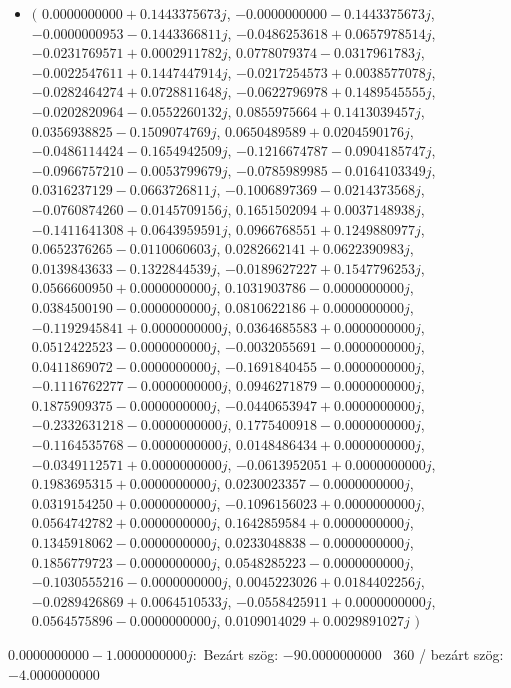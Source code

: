 \documentclass[14pt,a4paper]{article}
\begin{document}
\begin{itemize}
\item
$\big($
$0.0000000000+0.1443375673j$, $-0.0000000000-0.1443375673j$, $-0.0000000953-0.1443366811j$, $-0.0486253618+0.0657978514j$, $-0.0231769571+0.0002911782j$, $0.0778079374-0.0317961783j$, $-0.0022547611+0.1447447914j$, $-0.0217254573+0.0038577078j$, $-0.0282464274+0.0728811648j$, $-0.0622796978+0.1489545555j$, $-0.0202820964-0.0552260132j$, $0.0855975664+0.1413039457j$, $0.0356938825-0.1509074769j$, $0.0650489589+0.0204590176j$, $-0.0486114424-0.1654942509j$, $-0.1216674787-0.0904185747j$, $-0.0966757210-0.0053799679j$, $-0.0785989985-0.0164103349j$, $0.0316237129-0.0663726811j$, $-0.1006897369-0.0214373568j$, $-0.0760874260-0.0145709156j$, $0.1651502094+0.0037148938j$, $-0.1411641308+0.0643959591j$, $0.0966768551+0.1249880977j$, $0.0652376265-0.0110060603j$, $0.0282662141+0.0622390983j$, $0.0139843633-0.1322844539j$, $-0.0189627227+0.1547796253j$, $0.0566600950+0.0000000000j$, $0.1031903786-0.0000000000j$, $0.0384500190-0.0000000000j$, $0.0810622186+0.0000000000j$, $-0.1192945841+0.0000000000j$, $0.0364685583+0.0000000000j$, $0.0512422523-0.0000000000j$, $-0.0032055691-0.0000000000j$, $0.0411869072-0.0000000000j$, $-0.1691840455-0.0000000000j$, $-0.1116762277-0.0000000000j$, $0.0946271879-0.0000000000j$, $0.1875909375-0.0000000000j$, $-0.0440653947+0.0000000000j$, $-0.2332631218-0.0000000000j$, $0.1775400918-0.0000000000j$, $-0.1164535768-0.0000000000j$, $0.0148486434+0.0000000000j$, $-0.0349112571+0.0000000000j$, $-0.0613952051+0.0000000000j$, $0.1983695315+0.0000000000j$, $0.0230023357-0.0000000000j$, $0.0319154250+0.0000000000j$, $-0.1096156023+0.0000000000j$, $0.0564742782+0.0000000000j$, $0.1642859584+0.0000000000j$, $0.1345918062-0.0000000000j$, $0.0233048838-0.0000000000j$, $0.1856779723-0.0000000000j$, $0.0548285223-0.0000000000j$, $-0.1030555216-0.0000000000j$, $0.0045223026+0.0184402256j$, $-0.0289426869+0.0064510533j$, $-0.0558425911+0.0000000000j$, $0.0564575896-0.0000000000j$, $0.0109014029+0.0029891027j$
$\big)$
\end{itemize}
$0.0000000000-1.0000000000j$:\
Bezárt szög: $-90.0000000000$ \
360 / bezárt szög: $-4.0000000000$\
\end{document}
